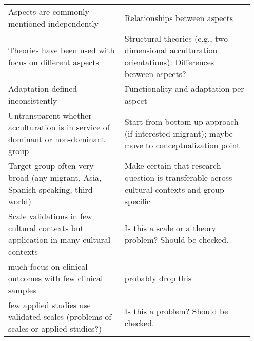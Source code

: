 \begin{table}
\begin{tabular}{>{\raggedright\arraybackslash}p{0.45\linewidth} 
>{\raggedright\arraybackslash}p{0.50\linewidth}}
\vspace{-0.5em} Aspects are commonly mentioned independently & 
\vspace{-0.5em} Relationships between aspects                                                                         \\ 

\vspace{-0.5em} Theories have been used with focus on different aspects & 
\vspace{-0.5em} Structural theories (e.g., two dimensional acculturation orientations): Differences between aspects?  \\ 

\vspace{-0.5em} Adaptation defined inconsistently & 
\vspace{-0.5em} Functionality and adaptation per aspect                                                               \\ 

\vspace{-0.5em} Untransparent whether acculturation is in service of dominant or non-dominant group & 
\vspace{-0.5em} Start from bottom-up approach (if interested migrant); maybe move to conceptualization point          \\ 

\vspace{-0.5em} Target group often very broad (any migrant, Asia, Spanish-speaking, third world) & 
\vspace{-0.5em} Make certain that research question is transferable across cultural contexts and group specific       \\ 

\vspace{-0.5em} Scale validations in few cultural contexts but application in many cultural contexts & 
\vspace{-0.5em} Is this a scale or a theory problem? Should be checked.                                               \\ 

\vspace{-0.5em} much focus on clinical outcomes with few clinical samples & 
\vspace{-0.5em} probably drop this                                                                                    \\ 

\vspace{-0.5em} few applied studies use validated scales (problems of scales or applied studies?) & 
\vspace{-0.5em} Is this a problem? Should be checked.                                                                 \\ 


\end{tabular}
\end{table}
